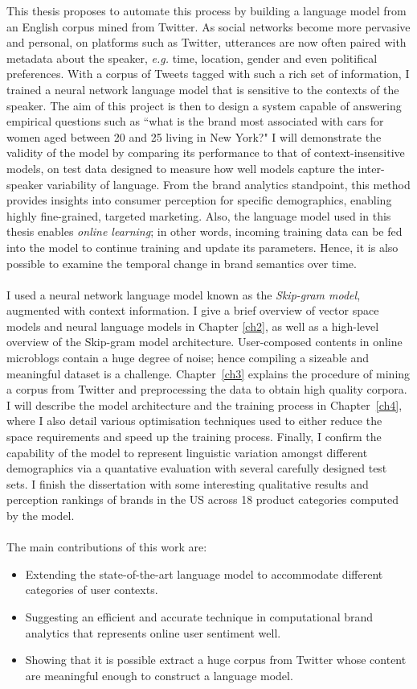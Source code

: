 \documentclass[a4paper,12pt,twoside,openright]{report}
\newcommand{\ti}{\textit}
\newcommand{\nl}{\\ \\}
\begin{document}
This thesis proposes to automate this process by building a language model from an English corpus mined from Twitter. As social networks become more pervasive and personal, on platforms such as Twitter, utterances are now often paired with metadata about the speaker, \ti{e.g.} time, location, gender and even politifical preferences. With a corpus of Tweets tagged with such a rich set of information, I trained a neural network language model that is sensitive to the contexts of the speaker. The aim of this project is then to design a system capable of answering empirical questions such as ``what is the brand most associated with cars for women aged between 20 and 25 living in New York?" I will demonstrate the validity of the model by comparing its performance to that of context-insensitive models, on test data designed to measure how well models capture the inter-speaker variability of language. From the brand analytics standpoint, this method provides insights into consumer perception for specific demographics, enabling highly fine-grained, targeted marketing. Also, the language model used in this thesis enables \ti{online learning}; in other words, incoming training data can be fed into the model to continue training and update its parameters. Hence, it is also possible to examine the temporal change in brand semantics over time.
\nl
I used a neural network language model known as the \ti{Skip-gram model}, augmented with context information. I give a brief overview of vector space models and neural language models in Chapter \ref{ch2}, as well as a high-level overview of the Skip-gram model architecture. User-composed contents in online microblogs contain a huge degree of noise; hence compiling a sizeable and meaningful dataset is a challenge. Chapter~\ref{ch3} explains the procedure of mining a corpus from Twitter and preprocessing the data to obtain high quality corpora. I will describe the model architecture and the training process in Chapter~\ref{ch4}, where I also detail various optimisation techniques used to either reduce the space requirements and speed up the training process. Finally, I confirm the capability of the model to represent linguistic variation amongst different demographics via a quantative evaluation with several carefully designed test sets. I finish the dissertation with some interesting qualitative results and perception rankings of brands in the US across 18 product categories computed by the model. 
\nl
The main contributions of this work are:
\begin{itemize}
	\item Extending the state-of-the-art language model to accommodate different categories of user contexts.
	\item Suggesting an efficient and accurate technique in computational brand analytics that represents online user sentiment well. 
	\item Showing that it is possible extract a huge corpus from Twitter whose content are meaningful enough to construct a language model.
\end{itemize}
\end{document}

